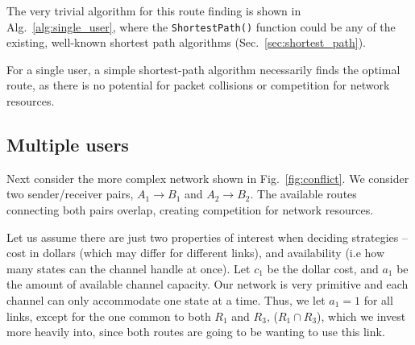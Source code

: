 \documentclass[aps, rmp, twocolumn, amsmath, amssymb, nofootinbib, superscriptaddress, longbibliography, floatfix, table-of-contents, eqsecnum]{revtex4-1}
\begin{document}
The very trivial algorithm for this route finding is shown in Alg.~\ref{alg:single_user}, where the \texttt{ShortestPath()} function could be any of the existing, well-known shortest path algorithms (Sec.~\ref{sec:shortest_path}).
\begin{table}[!htb]
\caption{For a single user, a simple shortest-path algorithm necessarily finds the optimal route, as there is no potential for packet collisions or competition for network resources.} \label{alg:single_user}
\end{table}

%
%

\subsection{Multiple users} \label{sec:two_user} 

Next consider the more complex network shown in Fig.~\ref{fig:conflict}. We consider two sender/receiver pairs, \mbox{$A_1\to B_1$} and \mbox{$A_2\to B_2$}. The available routes connecting both pairs overlap, creating competition for network resources.

Let us assume there are just two properties of interest when deciding strategies -- cost in dollars (which may differ for different links), and availability (i.e how many states can the channel handle at once). Let $c_1$ be the dollar cost, and \mbox{$a_1$} be the amount of available channel capacity. Our network is very primitive and each channel can only accommodate one state at a time. Thus, we let \mbox{$a_1=1$} for all links, except for the one common to both $R_1$ and $R_3$, \mbox{($R_1\cap R_3$)}, which we invest more heavily into, since both routes are going to be wanting to use this link.
\end{document}
